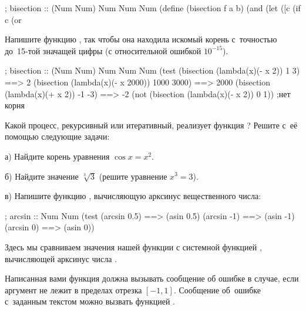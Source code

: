 \newcommand{\cmt}{\normalfont\itshape\color{gray!40!black}}
\begin{Definition}[emph={f,a,b}]
; bisection :: (Num \arrow Num) Num Num \arrow Num
(define (bisection f a b)
  (and %
       (let ([c %
         (if %
             c
             (or %
\end{Definition}\vspace{-\medskipamount}

\newpage
\begin{Assignment}

Напишите функцию , так чтобы она находила искомый корень с~точностью до~15-той значащей цифры (с относительной ошибкой $10^{-15}$).

\begin{Specification}
  ; bisection :: (Num \arrow Num) Num Num \arrow Num
  (test 
    (bisection (lambda(x)(- x 2)) 1 3)          ==> 2
    (bisection (lambda(x)(- x 2000)) 1000 3000) ==> 2000
    (bisection (lambda(x)(+ x 2)) -1 -3)        ==> -2
    (not (bisection (lambda(x)(- x 2)) 0 1))    ;нет корня    
\end{Specification}

Какой процесс, рекурсивный или итеративный, реализует функция ? Решите с~её помощью следующие задачи:

 а) Найдите корень уравнения $\cos x = x^2$.
 
 б) Найдите значение $\sqrt[3]3$ (решите уравнение $x^3 = 3$).

 в) Напишите функцию , вычисляющую арксинус вещественного числа:
\begin{Specification}
  ; arcsin :: Num \arrow Num
  (test 
    (arcsin 0.5)  ==> (asin 0.5)
    (arcsin -1)   ==> (asin -1)
    (arcsin 0)    ==> (asin 0))
\end{Specification}
Здесь мы сравниваем значения нашей функции с системной функцией , вычисляющей арксинус числа . 

Написанная вами функция  должна вызывать сообщение об ошибке в случае, если аргумент не лежит в пределах отрезка $[-1, 1]$. Сообщение об~ошибке с~заданным текстом можно вызвать функцией .

\end{Assignment}

